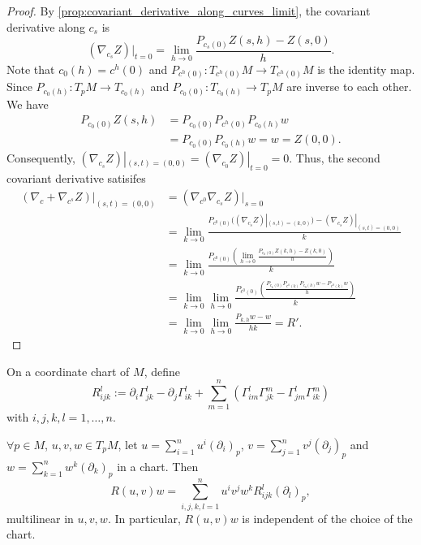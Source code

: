 \begin{proof}
By \autoref{prop:covariant_derivative_along_curves_limit}, the covariant derivative along $c_s$ is 
\[
(\nabla_{c_s}Z)\Big|_{t=0} = \lim_{h\to0}\frac{P_{c_s(0)}Z(s,h) - Z(s,0)}{h}.
\]
Note that $c_0(h) = c^h(0)$ and $P_{c^h(0)}: T_{c^h(0)}M \to T_{c^h(0)}M$ is the identity map.
Since $P_{c_0(h)}: T_pM \to T_{c_0(h)}$ and $P_{c_0(0)}: T_{c_0(h)} \to T_pM$ are inverse to each other. We have
\[
\begin{aligned}
P_{c_0(0)}Z(s,h) &= P_{c_0(0)}P_{c^h(0)}P_{c_0(h)}w \\
&= P_{c_0(0)}P_{c_0(h)}w = w = Z(0,0).
\end{aligned}
\]
Consequently, $(\nabla_{c_s}Z)|_{(s,t)=(0,0)} = (\nabla_{c_0}Z)|_{t=0} = 0$.
Thus, the second covariant derivative satisifes
\[
\begin{aligned}
(\nabla_c + \nabla_{c^s}Z)|_{(s,t)=(0,0)} &= (\nabla_{c^0}\nabla_{c_s}Z)|_{s=0} \\
&= \lim_{k\to0}\frac{P_{c^0(0)}((\nabla_{c_s}Z)|_{(s,t)=(k,0)}) - (\nabla_{c_s}Z)|_{(s,t)=(0,0)}}{k} \\
&= \lim_{k\to0}\frac{P_{c^0(0)}\left(\lim_{h\to0}\frac{P_{c_k(0)}Z(k,h) - Z(k,0)}{h}\right)}{k} \\
&= \lim_{k\to0}\lim_{h\to0}\frac{P_{c^0(0)}\left(\frac{P_{c_k(0)}P_{c^h(k)}P_{c_0(h)}w - P_{c^0(k)}w}{h}\right)}{k} \\
&= \lim_{k\to0}\lim_{h\to0}\frac{P_{k,h}w-w}{hk} = R'.
\end{aligned}
\]
\end{proof}

\begin{definition}
On a coordinate chart of $M$, define
\[
R_{ijk}^l := \partial_i\Gamma_{jk}^l - \partial_j\Gamma_{ik}^l + \sum_{m=1}^n\left(\Gamma_{im}^l\Gamma_{jk}^m - \Gamma_{jm}^l\Gamma_{ik}^m\right)
\]
with $i,j,k,l = 1, \dots, n$.
\end{definition}

\begin{theorem}\label{thm:8.5}
$\forall p \in M$, $u,v,w \in T_pM$, let $u = \sum_{i = 1}^n u^i(\partial_i)_p$,
$v = \sum_{j=1}^n v^j(\partial_j)_p$ and $w = \sum_{k=1}^n w^k(\partial_k)_p$ in a chart. Then
\[
R(u,v)w = \sum_{i,j,k,l=1}^n u^iv^jw^kR_{ijk}^l(\partial_l)_p,
\]
multilinear in $u,v,w$. In particular, $R(u,v)w$ is independent of the choice of the chart.
\end{theorem}

